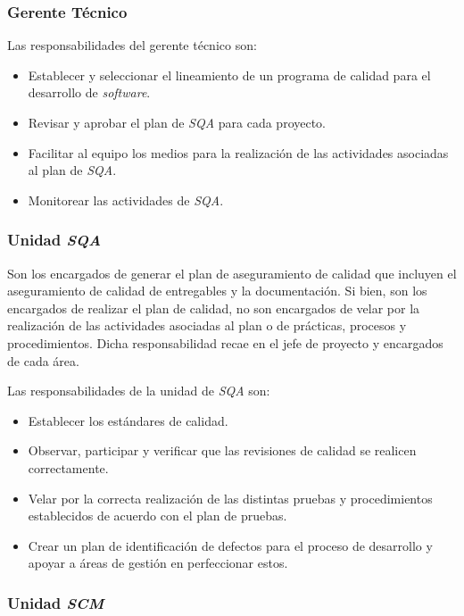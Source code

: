 \subsubsection{Gerente Técnico}

Las responsabilidades del gerente técnico son:

	\begin{itemize}
		\item 
		 Establecer y seleccionar el lineamiento de un programa de calidad para el desarrollo de \textit{software}.
		\item
		 Revisar y aprobar el plan de \textit{SQA} para cada proyecto. 
		 \item
		 Facilitar al equipo los medios para la realización de las actividades asociadas al plan de \textit{SQA}.
		 \item 
		 Monitorear las actividades de \textit{SQA}.
	\end{itemize}

\subsubsection{Unidad \textit{SQA}}

Son los encargados de generar el plan de aseguramiento de calidad que incluyen el aseguramiento de calidad de entregables y la documentación. Si bien, son los encargados de realizar el plan de calidad, no son encargados de velar por la realización de las actividades asociadas al plan o de prácticas, procesos y procedimientos. Dicha responsabilidad recae en el jefe de proyecto y encargados de cada área.

Las responsabilidades de la unidad de \textit{SQA} son: 

	\begin{itemize}
		\item 
		 Establecer los estándares de calidad.
		\item
		 Observar, participar y verificar que las revisiones de calidad se realicen correctamente. 
		 \item
		Velar por la correcta realización de las distintas pruebas y procedimientos establecidos de acuerdo con el plan de pruebas.
		 \item 
		Crear un plan de identificación de defectos para el proceso de desarrollo y apoyar a áreas de gestión en perfeccionar estos.
	\end{itemize}

\subsubsection{Unidad \textit{SCM}}

